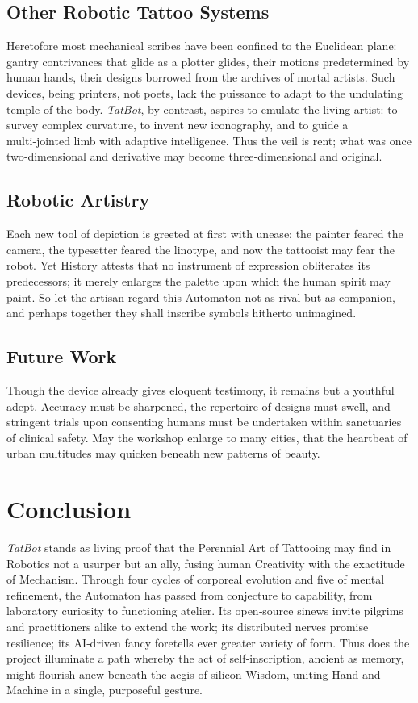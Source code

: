 \documentclass[11pt]{article}
\begin{document}
\subsection{Other Robotic Tattoo Systems}

Heretofore most mechanical scribes have been confined to the Euclidean plane: gantry contrivances that glide as a plotter glides, their motions predetermined by human hands, their designs borrowed from the archives of mortal artists.  
Such devices, being printers, not poets, lack the puissance to adapt to the undulating temple of the body.  
\emph{TatBot}, by contrast, aspires to emulate the living artist: to survey complex curvature, to invent new iconography, and to guide a multi‑jointed limb with adaptive intelligence.  
Thus the veil is rent; what was once two‑dimensional and derivative may become three‑dimensional and original.

\subsection{Robotic Artistry}

Each new tool of depiction is greeted at first with unease: the painter feared the camera, the typesetter feared the linotype, and now the tattooist may fear the robot.  
Yet History attests that no instrument of expression obliterates its predecessors; it merely enlarges the palette upon which the human spirit may paint.  
So let the artisan regard this Automaton not as rival but as companion, and perhaps together they shall inscribe symbols hitherto unimagined.

\subsection{Future Work}

Though the device already gives eloquent testimony, it remains but a youthful adept.  
Accuracy must be sharpened, the repertoire of designs must swell, and stringent trials upon consenting humans must be undertaken within sanctuaries of clinical safety.  
May the workshop enlarge to many cities, that the heartbeat of urban multitudes may quicken beneath new patterns of beauty.

\section{Conclusion}

\emph{TatBot} stands as living proof that the Perennial Art of Tattooing may find in Robotics not a usurper but an ally, fusing human Creativity with the exactitude of Mechanism.  
Through four cycles of corporeal evolution and five of mental refinement, the Automaton has passed from conjecture to capability, from laboratory curiosity to functioning atelier.  
Its open‑source sinews invite pilgrims and practitioners alike to extend the work; its distributed nerves promise resilience; its AI‑driven fancy foretells ever greater variety of form.  
Thus does the project illuminate a path whereby the act of self‑inscription, ancient as memory, might flourish anew beneath the aegis of silicon Wisdom, uniting Hand and Machine in a single, purposeful gesture.



\end{document}
